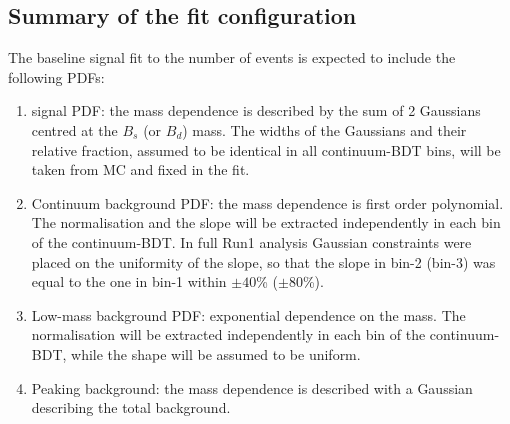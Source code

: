 \subsection{Summary of the fit configuration}\label{sub:sec:fit_summary}
The baseline signal fit to the number of events is expected to include the following PDFs: 
\begin{enumerate}
\item{signal PDF:} the mass dependence is described  by the sum of 2 Gaussians 
centred at the $B_s$ (or $B_d$) mass. The widths of the Gaussians and their relative fraction, assumed to
be identical in all continuum-BDT bins, will be taken from MC and fixed in the fit. 

\item{Continuum background PDF:} the mass dependence is first order polynomial. The normalisation and the 
slope will be extracted independently in each bin of the continuum-BDT.  
In full Run1 analysis Gaussian constraints were placed on the uniformity of the slope, so 
that the slope in bin-2  (bin-3) was equal to the one in bin-1 within $\pm 40$\% 
($\pm 80$\%). 

\item{Low-mass background PDF:} exponential dependence on the mass.
The normalisation will be extracted independently in each bin of the continuum-BDT, 
while the shape will be assumed to be uniform.

\item {Peaking background:} the mass dependence is described with a Gaussian describing the total
background. %
\end{enumerate}

